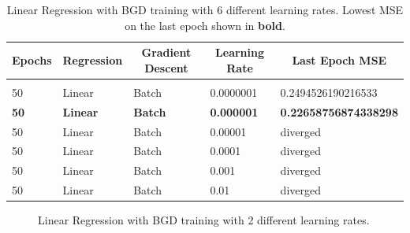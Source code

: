\documentclass{article} %
\begin{document}
\begin{table}[!htbp]
\caption{Linear Regression with BGD training with 6 different learning rates. Lowest MSE on the last epoch shown in \textbf{bold}.}
\label{Table3}
\begin{center}
\begin{tabular}{l l l l l}
\multicolumn{1}{c}{\bf Epochs} &\multicolumn{1}{c}{\bf Regression}  &\multicolumn{1}{c}{\bf Gradient Descent} &\multicolumn{1}{c}{\bf Learning Rate} &\multicolumn{1}{c}{\bf Last Epoch MSE}
\\ \hline \\

50 & Linear & Batch & 0.0000001 & 0.2494526190216533\\

\textbf{50} & \textbf{Linear} & \textbf{Batch} & \textbf{0.000001} & \textbf{0.22658756874338298}\\

50 & Linear & Batch & 0.00001   & diverged\\
50 & Linear & Batch & 0.0001    & diverged\\
50 & Linear & Batch & 0.001     & diverged\\
50 & Linear & Batch & 0.01      & diverged\\
\end{tabular}
\end{center}
\end{table}

\begin{figure}[!htbp]
\begin{center}
\end{center}
\caption{Linear Regression with BGD training with 2 different learning rates.}
\label{Fig4}
\end{figure}
\end{document}
